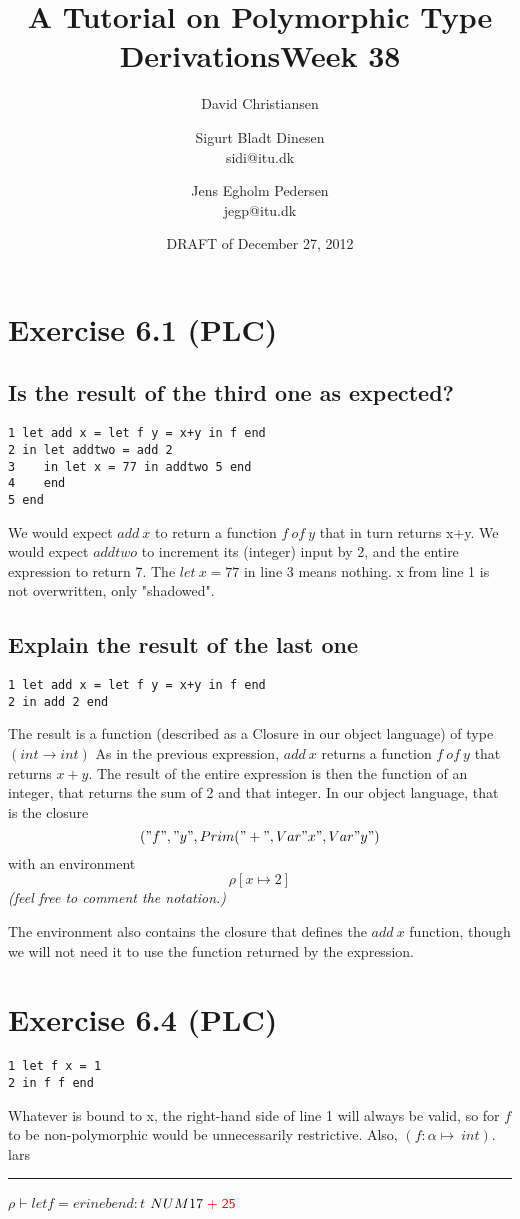 \documentclass[a4paper]{article}
\title{A Tutorial on Polymorphic Type Derivations}
\author{David Christiansen}
\date{DRAFT of December 27, 2012}
\newcommand{\expr}[1]{\ensuremath{\textcolor{term}{#1}}}
\newcommand{\const}[1]{\mathsf{#1}}
\newcommand{\PLUS}[2]{#1\;\expr{+}\;#2}
\newcommand{\NUM}[1]{\expr{\const{#1}}}
\begin{document}
\title{Week 38}
\author{Sigurt Bladt Dinesen \\sidi{@}itu.dk \and Jens Egholm Pedersen \\jegp{@}itu.dk}
\maketitle
\section*{Exercise 6.1 (PLC)}
\subsection*{Is the result of the third one as expected?}
\begin{verbatim}
1 let add x = let f y = x+y in f end
2 in let addtwo = add 2
3    in let x = 77 in addtwo 5 end
4    end
5 end
\end{verbatim}
We would expect $add\ x$ to return a function $f\ of\ y$ that in turn returns x+y.
We would expect $addtwo$ to increment its (integer) input by 2, and the entire expression
to return 7.
The $let\ x = 77$ in line 3 means nothing. x from line 1 is not overwritten, only "shadowed".

\subsection*{Explain the result of the last one}
\begin{verbatim}
1 let add x = let f y = x+y in f end
2 in add 2 end
\end{verbatim}
The result is a function (described as a Closure in our object language) of
type $(int \to int)$ As in the previous expression, $add\ x$ returns a function
$f\ of\ y$ that returns $x+y$. The result of the entire expression is then the
function of an integer, that returns the sum of 2 and that integer.
In our object language, that is the closure
$$("f","y", Prim("+", Var "x", Var "y")$$
with an environment $$\rho [x \mapsto 2]$$
\textit{\small{(feel free to comment the notation.)}}

The environment also contains the closure that defines the $add\ x$ function,
though we will not need it to use the function returned by the expression.

\section*{Exercise 6.4 (PLC)}
\begin{verbatim}
1 let f x = 1
2 in f f end
\end{verbatim}
Whatever is bound to x, the right-hand side of line 1 will always be valid, so
for $f$ to be non-polymorphic would be unnecessarily restrictive.
Also, $(f : \alpha \mapsto \ int)$.
lars\\

\hrule
$\rho \vdash let f = er in eb end :t$
$\PLUS{NUM{17}}{\NUM{25}}$
\end{document}

